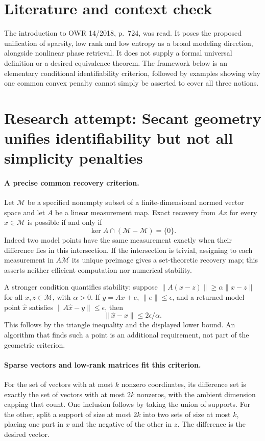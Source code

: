 \documentclass[11pt]{article}
\begin{document}
\section{Literature and context check}
The introduction to OWR 14/2018, p.~724, was read. It poses the proposed unification of sparsity, low rank and low entropy as a broad modeling direction, alongside nonlinear phase retrieval. It does not supply a formal universal definition or a desired equivalence theorem. The framework below is an elementary conditional identifiability criterion, followed by examples showing why one common convex penalty cannot simply be asserted to cover all three notions.
\section{Research attempt: Secant geometry unifies identifiability but not all simplicity penalties}

\paragraph{A precise common recovery criterion.}
Let $\mathcal M$ be a specified nonempty subset of a finite-dimensional normed vector space and let $A$ be a linear measurement map. Exact recovery from $Ax$ for every $x\in\mathcal M$ is possible if and only if
\[
 \ker A\cap(\mathcal M-\mathcal M)=\{0\}.
\]
Indeed two model points have the same measurement exactly when their difference lies in this intersection. If the intersection is trivial, assigning to each measurement in $A\mathcal M$ its unique preimage gives a set-theoretic recovery map; this asserts neither efficient computation nor numerical stability.

A stronger condition quantifies stability: suppose $\|A(x-z)\|\ge\alpha\|x-z\|$ for all $x,z\in\mathcal M$, with $\alpha>0$. If $y=Ax+e$, $\|e\|\le\epsilon$, and a returned model point $\widehat x$ satisfies $\|A\widehat x-y\|\le\epsilon$, then
\[
 \|\widehat x-x\|\le2\epsilon/\alpha.
\]
This follows by the triangle inequality and the displayed lower bound. An algorithm that finds such a point is an additional requirement, not part of the geometric criterion.

\paragraph{Sparse vectors and low-rank matrices fit this criterion.}
For the set of vectors with at most $k$ nonzero coordinates, its difference set is exactly the set of vectors with at most $2k$ nonzeros, with the ambient dimension capping that count. One inclusion follows by taking the union of supports. For the other, split a support of size at most $2k$ into two sets of size at most $k$, placing one part in $x$ and the negative of the other in $z$. The difference is the desired vector.
\end{document}
